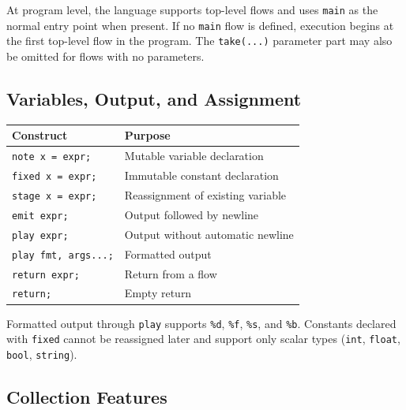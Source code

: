 \documentclass[12pt,a4paper]{article}
\begin{document}
At program level, the language supports top-level flows and uses \texttt{main} as the normal entry point when present. If no \texttt{main} flow is defined, execution begins at the first top-level flow in the program. The \texttt{take(...)} parameter part may also be omitted for flows with no parameters.

\subsection*{Variables, Output, and Assignment}

\begin{table}[H]
\centering
\begin{tabularx}{\textwidth}{l X}
\toprule
\textnormal{Construct} & \textnormal{Purpose} \\
\midrule
\texttt{note x = expr;} & Mutable variable declaration \\
\texttt{fixed x = expr;} & Immutable constant declaration \\
\texttt{stage x = expr;} & Reassignment of existing variable \\
\texttt{emit expr;} & Output followed by newline \\
\texttt{play expr;} & Output without automatic newline \\
\texttt{play fmt, args...;} & Formatted output \\
\texttt{return expr;} & Return from a flow \\
\texttt{return;} & Empty return \\
\bottomrule
\end{tabularx}
\end{table}

Formatted output through \texttt{play} supports \texttt{\%d}, \texttt{\%f}, \texttt{\%s}, and \texttt{\%b}. Constants declared with \texttt{fixed} cannot be reassigned later and support only scalar types (\texttt{int}, \texttt{float}, \texttt{bool}, \texttt{string}).

\subsection*{Collection Features}
\end{document}
